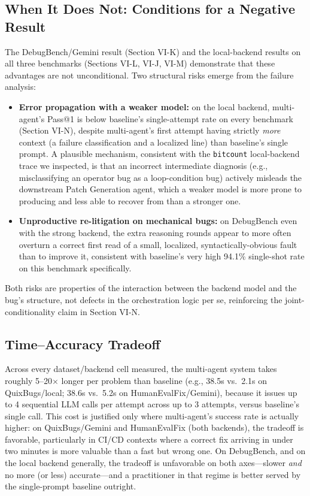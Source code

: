 \documentclass[conference]{IEEEtran}
\begin{document}
\subsection{When It Does Not: Conditions for a Negative Result}
The DebugBench/Gemini result (Section VI-K) and the local-backend results on all three benchmarks (Sections VI-L, VI-J, VI-M) demonstrate that these advantages are not unconditional. Two structural risks emerge from the failure analysis:
\begin{itemize}
    \item \textbf{Error propagation with a weaker model:} on the local backend, multi-agent's Pass@1 is below baseline's single-attempt rate on every benchmark (Section VI-N), despite multi-agent's first attempt having strictly \emph{more} context (a failure classification and a localized line) than baseline's single prompt. A plausible mechanism, consistent with the \texttt{bitcount} local-backend trace we inspected, is that an incorrect intermediate diagnosis (e.g., misclassifying an operator bug as a loop-condition bug) actively misleads the downstream Patch Generation agent, which a weaker model is more prone to producing and less able to recover from than a stronger one.
    \item \textbf{Unproductive re-litigation on mechanical bugs:} on DebugBench even with the strong backend, the extra reasoning rounds appear to more often overturn a correct first read of a small, localized, syntactically-obvious fault than to improve it, consistent with baseline's very high 94.1\% single-shot rate on this benchmark specifically.
\end{itemize}
Both risks are properties of the interaction between the backend model and the bug's structure, not defects in the orchestration logic per se, reinforcing the joint-conditionality claim in Section VI-N.

\subsection{Time--Accuracy Tradeoff}
Across every dataset/backend cell measured, the multi-agent system takes roughly 5--20$\times$ longer per problem than baseline (e.g., 38.5s vs.\ 2.1s on QuixBugs/local; 38.6s vs.\ 5.2s on HumanEvalFix/Gemini), because it issues up to 4 sequential LLM calls per attempt across up to 3 attempts, versus baseline's single call. This cost is justified only where multi-agent's success rate is actually higher: on QuixBugs/Gemini and HumanEvalFix (both backends), the tradeoff is favorable, particularly in CI/CD contexts where a correct fix arriving in under two minutes is more valuable than a fast but wrong one. On DebugBench, and on the local backend generally, the tradeoff is unfavorable on both axes---slower \emph{and} no more (or less) accurate---and a practitioner in that regime is better served by the single-prompt baseline outright.
\end{document}
